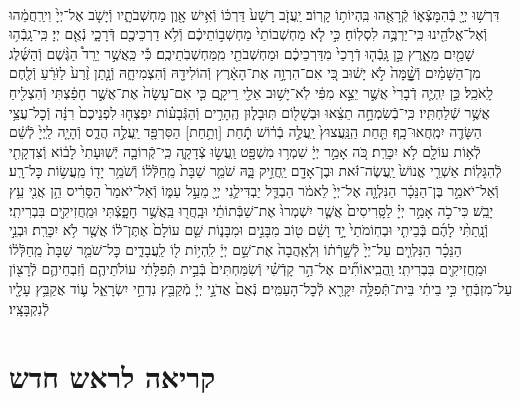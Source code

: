 \documentclass[twoside, openany, parskip=half, 11pt]{book}
\begin{document}
\begin{footnotesize}
\begin{multicols}{2}
\\
דִּרְשׁ֥וּ יְיָ֖ בְּֿהִמָּצְֿא֑וֹ קְֿרָאֻ֖הוּ בִּֽהְיוֹת֥וֹ קָרֽוֹב׃ יַֽעֲזֹ֤ב רָשָׁע֙ דַּרְכּ֔וֹ וְֿאִ֥ישׁ אָ֖וֶן מַחְשְׁבֹתָ֑יו וְֿיָשֹׁ֤ב אֶל־יְיָ֙ וִירַֽחֲמֵ֔הוּ וְֿאֶל־אֱלֹהֵ֖ינוּ כִּֽי־יַרְבֶּ֥ה לִסְלֽוֹחַ׃ כִּ֣י לֹ֤א מַחְשְׁבוֹתַי֙ מַחְשְׁב֣וֹתֵיכֶ֔ם וְֿלֹ֥א דַרְכֵיכֶ֖ם דְּֿרָכָ֑י נְֿאֻ֖ם יְיָ׃ כִּֽי־גָֽבְֿה֥וּ שָׁמַ֖יִם מֵאָ֑רֶץ כֵּ֣ן גָּֽבְֿה֤וּ דְֿרָכַי֙ מִדַּרְכֵיכֶ֔ם וּמַחְשְׁבֹתַ֖י מִֽמַּחְשְׁבֹֽתֵיכֶֽם׃ כִּ֡י כַּֽאֲשֶׁ֣ר יֵרֵד֩ הַגֶּ֨שֶׁם וְֿהַשֶּׁ֜לֶג מִן־הַשָּׁמַ֗יִם וְֿשׇׇׇׇָׁ֨מָּה֙ לֹ֣א יָשׁ֔וּב כִּ֚י אִם־הִרְוָ֣ה אֶת־הָאָ֔רֶץ וְֿהוֹלִידָ֖הּ וְֿהִצְמִיחָ֑הּ וְֿנָ֤תַן זֶ֨רַע֙ לַזֹּרֵ֔עַ וְֿלֶ֖חֶם לָֽאֹכֵֽל׃ כֵּ֣ן יִֽהְיֶ֤ה דְֿבָרִי֙ אֲשֶׁ֣ר יֵצֵ֣א מִפִּ֔י לֹֽא־יָשׁ֥וּב אֵלַ֖י רֵיקָ֑ם כִּ֤י אִם־עָשָׂה֙ אֶת־אֲשֶׁ֣ר חָפַ֔צְתִּי וְֿהִצְלִ֖יחַ אֲשֶׁ֥ר שְֿׁלַחְתִּֽיו׃ כִּֽי־בְֿשִׂמְחָ֣ה תֵצֵ֔אוּ וּבְשָׁל֖וֹם תּֽוּבָל֑וּן הֶֽהָרִ֣ים וְֿהַגְּֿבָע֗וֹת יִפְצְח֤וּ לִפְנֵיכֶם֙ רִנָּ֔ה וְֿכׇל־עֲצֵ֥י הַשָּׂדֶ֖ה יִמְֽחֲאוּ־כָֽף׃ תַּ֤חַת הַֽנַּֽעֲצוּץ֙ יַֽעֲלֶ֣ה בְֿר֔וֹשׁ תְַֿ֥חַת [וְתַ֥חַת] הַסִּרְפָּ֖ד יַֽעֲלֶ֣ה הֲדַ֑ס וְֿהָיָ֤ה לַֽיְיָ֙ לְֿשֵׁ֔ם לְֿא֥וֹת עוֹלָ֖ם לֹ֥א יִכָּרֵֽת׃ כֹּ֚ה אָמַ֣ר יְיָ֔ שִׁמְר֥וּ מִשְׁפָּ֖ט וַֽעֲשׂ֣וּ צְֿדָקָ֑ה כִּֽי־קְֿרוֹבָ֤ה יְֿשֽׁוּעָתִי֙ לָב֔וֹא וְֿצִדְקָתִ֖י לְֿהִגָּלֽוֹת׃ אַשְׁרֵ֤י אֱנוֹשׁ֙ יַֽעֲשֶׂה־זֹּ֔את וּבֶן־אָדָ֖ם יַֽחֲזִ֣יק בָּ֑הּ שֹׁמֵ֤ר שַׁבָּת֙ מֵֽחַלְּֿל֔וֹ וְֿשֹׁמֵ֥ר יָד֖וֹ מֵֽעֲשׂ֥וֹת כׇּל־רָֽע׃ וְֿאַל־יֹאמַ֣ר בֶּן־הַנֵּכָ֔ר הַנִּלְוָ֤ה אֶל־יְיָ֙ לֵאמֹ֔ר הַבְדֵּ֧ל יַבְדִּילַ֛נִי יְיָ֖ מֵעַ֣ל עַמּ֑וֹ וְֿאַל־יֹאמַר֙ הַסָּרִ֔יס הֵ֥ן אֲנִ֖י עֵ֥ץ יָבֵֽשׁ׃ כִּי־כֹ֣ה אָמַ֣ר יְיָ֗ לַסָּֽרִיסִים֙ אֲשֶׁ֤ר יִשְׁמְרוּ֙ אֶת־שַׁבְּֿתוֹתַ֔י וּבָֽחֲר֖וּ בַּֽאֲשֶׁ֣ר חָפָ֑צְֿתִּי וּמַֽחֲזִיקִ֖ים בִּבְרִיתִֽי׃ וְֿנָֽתַתִּ֨י לָהֶ֜ם בְּֿבֵיתִ֤י וּבְחֽוֹמֹתַי֙ יָ֣ד וָשֵׁ֔ם ט֖וֹב מִבָּנִ֣ים וּמִבָּנ֑וֹת שֵׁ֤ם עוֹלָם֙ אֶתֶּן־ל֔וֹ אֲשֶׁ֖ר לֹ֥א יִכָּרֵֽת׃ וּבְנֵ֣י הַנֵּכָ֗ר הַנִּלְוִ֤ים עַל־יְיָ֙ לְֿשָׁ֣רְֿת֔וֹ וּֽלְאַֽהֲבָה֙ אֶת־שֵׁ֣ם יְיָ֔ לִֽהְי֥וֹת ל֖וֹ לַֽעֲבָדִ֑ים כׇּל־שֹׁמֵ֤ר שַׁבָּת֙ מֵֽחַלְּֿל֔וֹ וּמַֽחֲזִיקִ֖ים בִּבְרִיתִֽי׃ וַֽהֲבִֽיאוֹתִ֞ים אֶל־הַ֣ר קָדְֿשִׁ֗י וְֿשִׂמַּחְתִּים֙ בְּֿבֵ֣ית תְּֿפִלָּתִ֔י עוֹלֹתֵיהֶ֧ם וְֿזִבְחֵיהֶ֛ם לְֿרָצ֖וֹן עַל־מִזְבְּֿחִ֑י כִּ֣י בֵיתִ֔י בֵּית־תְּֿפִלָּ֥ה יִקָּרֵ֖א לְֿכׇל־הָעַמִּֽים׃ נְֿאֻם֙ אֲדֹנָ֣י יְיָ֔ מְֿקַבֵּ֖ץ נִדְחֵ֣י יִשְׂרָאֵ֑ל ע֛וֹד אֲקַבֵּ֥ץ עָלָ֖יו לְֿנִקְבָּצָֽיו׃

\end{multicols}

\section[ראש חדש]{קריאה לראש חדש}



\end{footnotesize}
\end{document}

